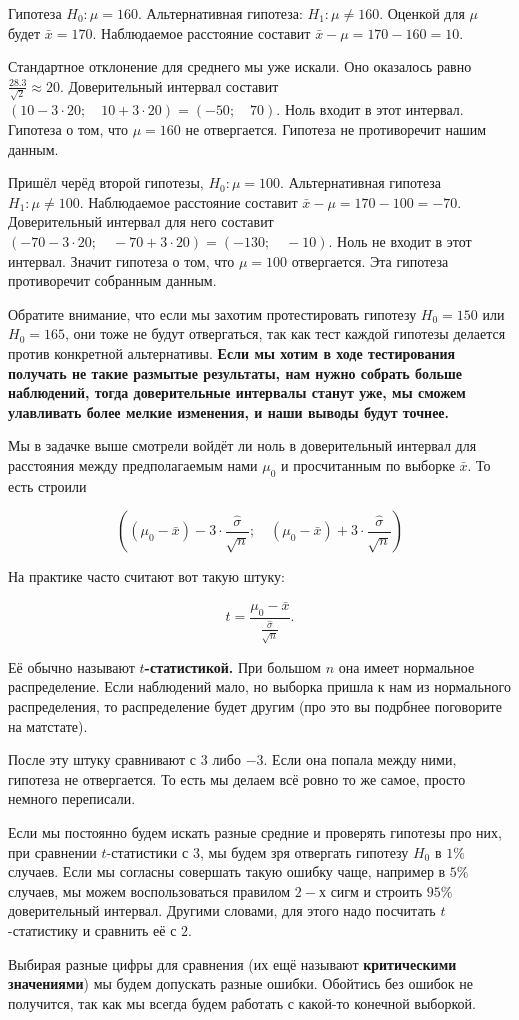 \documentclass[12pt, a4paper, oneside]{article}
\theoremstyle{plain} %
\theoremstyle{definition}
\newcommand{\indef}[1]{\textbf{ \color{green} #1}}
\begin{document}
\begin{solution}
Гипотеза $H_0:  \mu = 160.$  Альтернативная гипотеза: $H_1: \mu \ne 160$. Оценкой для $\mu$ будет $\bar x = 170$.  Наблюдаемое расстояние составит $\bar x - \mu = 170 - 160 = 10$. 

Стандартное отклонение для среднего мы уже искали. Оно оказалось равно $\frac{28.3}{\sqrt{2}} \approx 20$. Доверительный интервал составит $(10 - 3 \cdot 20; \quad  10 + 3 \cdot 20) = (-50; \quad  70)$.  Ноль входит в этот интервал. Гипотеза о том, что $\mu = 160$ не отвергается. Гипотеза не противоречит нашим данным.

Пришёл черёд второй гипотезы, $H_0: \mu = 100.$ Альтернативная гипотеза $H_1: \mu \ne 100$. Наблюдаемое расстояние составит $\bar x - \mu = 170 - 100 = -70$.  Доверительный интервал для него составит $(-70 - 3 \cdot 20; \quad -70 + 3 \cdot 20) = (-130; \quad -10)$. Ноль не входит в этот интервал. Значит гипотеза о том, что $\mu = 100$ отвергается. Эта гипотеза противоречит собранным данным.

Обратите внимание, что если мы захотим протестировать гипотезу $H_0 = 150$ или $H_0 = 165$, они тоже не будут отвергаться, так как тест каждой гипотезы делается против конкретной альтернативы. \indef{Если мы хотим в ходе тестирования получать не такие размытые результаты, нам нужно собрать больше наблюдений, тогда доверительные интервалы станут уже, мы сможем улавливать более мелкие изменения, и наши выводы будут точнее.}

Мы в задачке выше смотрели войдёт ли ноль в доверительный интервал для расстояния между предполагаемым нами $\mu_0$ и просчитанным по выборке $\bar x$. То есть строили 

\[ 
\left((\mu_0 - \bar x) - 3 \cdot \frac{\hat \sigma}{\sqrt{n}}; \quad (\mu_0 - \bar x) + 3 \cdot \frac{\hat \sigma}{\sqrt{n}} \right)
\] 

На практике часто считают вот такую штуку: 

$$
t = \frac{\mu_0 - \bar x}{\frac{\hat \sigma}{\sqrt{n}}}.
$$

Её обычно называют \indef{$t$-статистикой.} При большом $n$ она имеет нормальное распределение. Если наблюдений мало, но выборка пришла к нам из нормального распределения, то распределение будет другим (про это вы подрбнее поговорите на матстате). 

После эту штуку сравнивают с $3$ либо $-3$. Если она попала между ними, гипотеза не отвергается. То есть мы делаем всё ровно то же самое, просто немного переписали. 

Если мы постоянно будем искать разные средние и проверять гипотезы про них, при сравнении $t$-статистики с $3$, мы будем зря отвергать гипотезу $H_0$ в $1\%$ случаев. Если мы согласны совершать такую ошибку чаще, например в $5\%$ случаев, мы можем воспользоваться правилом $2-$х сигм и строить $95\%$ доверительный интервал. Другими словами, для этого надо посчитать $t$-статистику и сравнить её с $2$. 

Выбирая разные цифры для сравнения (их ещё называют \indef{критическими значениями}) мы будем допускать разные ошибки. Обойтись без ошибок не получится, так как мы всегда будем работать с какой-то конечной выборкой.
\end{solution}
\end{document}
